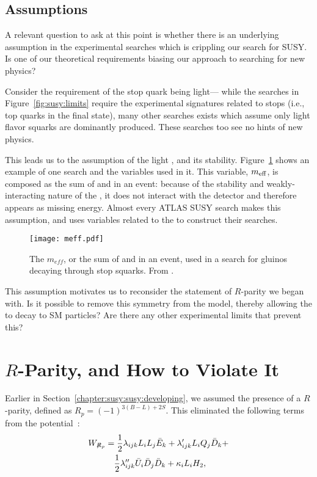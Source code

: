\subsection{Assumptions}

A relevant question to ask at this point is whether there is an underlying assumption in the experimental searches which is crippling our search for SUSY. Is one of our theoretical requirements biasing our approach to searching for new physics?

Consider the requirement of the stop quark being light--- while the searches in Figure~\ref{fig:susy:limits} require the experimental signatures related to stops (i.e., top quarks in the final state), many other searches exists which assume only light flavor squarks are dominantly produced. These searches too see no hints of new physics.

This leads us to the assumption of the light \lsp, and its stability. Figure~\ref{fig:susy:meff} shows an example of one search and the variables used in it. This variable, $m_{\rm eff}$, is composed as the sum of \met and \Ht in an event: because of the stability and weakly-interacting nature of the \lsp, it does not interact with the detector and therefore appears as missing energy. Almost every ATLAS SUSY search makes this assumption, and uses variables related to the \met to construct their searches. 
 

\begin{figure}
\centering
\texttt{[image: meff.pdf]}
\caption{The $m_{eff}$, or the sum of \met and \Ht in an event, used in a search for gluinos decaying through stop squarks. From \cite{Aad:2014lra}.}
\label{fig:susy:meff}
\end{figure}


This assumption motivates us to reconsider the statement of $R$-parity we began with. Is it possible to remove this symmetry from the model, thereby allowing the \lsp to decay to SM particles? Are there any other experimental limits that prevent this? 

\section{$R$-Parity, and How to Violate It}
\label{chapter:susy:r}
Earlier in Section~\ref{chapter:susy:susy:developing}, we assumed the presence of a $R$-parity, defined as $R_p = (-1)^{3(B-L)+2S}$. This eliminated the following terms from the potential~\cite{dreinerRPV}:
%
  \begin{eqnarray} 
    W_{\not R_p} &= \frac{1}{2} \lambda_{ijk} L_{i}L_{j}\bar E_{k} + \lambda_{ijk}^{\prime} L_{i}Q_{j}\bar D_{k} +  \nonumber \\
       & \quad \frac{1}{2}\lambda_{ijk}^{\prime\prime}\bar U_{i}\bar D_{j}\bar D_{k} + \kappa_iL_{i}H_{2},
    \label{eqn:rpvandudd:wrpv}
  \end{eqnarray} 

